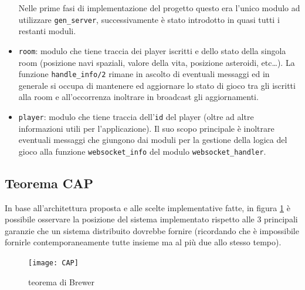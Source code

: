 \documentclass[paper=a4, fontsize=11pt]{scrartcl} %
\numberwithin{equation}{section} %
\numberwithin{figure}{section} %
\numberwithin{table}{section} %
\begin{document}
\begin{itemize}
Nelle prime fasi di implementazione del progetto questo era l'unico modulo ad utilizzare \texttt{gen\_server}, successivamente è stato introdotto in quasi tutti i restanti moduli. 

\item \texttt{room}: modulo che tiene traccia dei player iscritti e dello stato della singola room (posizione navi spaziali, valore della vita, posizione asteroidi, etc\dots).
La funzione \texttt{handle\_info/2} rimane in ascolto di eventuali messaggi ed in generale si occupa di mantenere ed aggiornare lo stato di gioco tra gli iscritti alla room e all'occorrenza inoltrare in broadcast gli aggiornamenti.
\item \texttt{player}: modulo che tiene traccia dell'\texttt{id} del player (oltre ad altre informazioni utili per l'applicazione). Il suo scopo principale è inoltrare eventuali messaggi che giungono dai moduli per la gestione della logica del gioco alla funzione \texttt{websocket\_info} del modulo \texttt{websocket\_handler}.
\end{itemize}

\subsection{Teorema CAP}
In base all'architettura proposta e alle scelte implementative fatte, in figura \ref{CAP} è possibile osservare la posizione del sistema implementato rispetto alle 3 principali garanzie che un sistema distribuito dovrebbe fornire (ricordando che è impossibile fornirle contemporaneamente tutte insieme ma al più due allo stesso tempo).
\begin{figure}
\centering
\texttt{[image: CAP]}
\caption{teorema di Brewer}
\label{CAP}
\end{figure}
\end{document}
